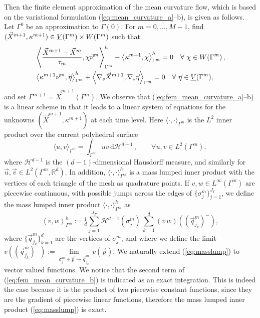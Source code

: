 Then the finite element approximation of the mean curvature flow, which is
based on the variational formulation (\ref{eq:mean_curvature_a}--b), is given
as follows. Let $\Gamma^0$ be an approximation to $\Gamma(0)$. For $m=0,\ldots,
M-1$, find $(\vec{X}^{m+1}, \kappa^{m+1}) \in \underline{V}(\Gamma^m) \times W(\Gamma^m)$
such that
\begin{subequations}
\begin{align}
&\left\langle \frac{\vec{X}^{m + 1} - \vec{X}^{m}}{\tau_m},
\chi\vec{\nu}^m\right\rangle_{\Gamma^m}^h - \left\langle\kappa^{m+1}, \chi
\right\rangle_{\Gamma^m}^h=0\quad \forall\ \chi \in
W(\Gamma^m)\,,\label{eq:fem_mean_curvature_a}\\
&\left\langle\kappa^{m+1}\vec{\nu}^m, \vec{\eta}\right\rangle_{\Gamma^m}^{h} +
\left\langle\nabla_s\vec{X}^{m + 1},
\nabla_s\vec{\eta}\right\rangle_{\Gamma^m}=0\quad \forall\ \vec\eta \in \underline{V}(\Gamma^m),
\label{eq:fem_mean_curvature_b}
\end{align}
\end{subequations}
and set $\Gamma^{m+1} = \vec{X}^{m+1}(\Gamma^m)$. We observe that
(\ref{eq:fem_mean_curvature_a}--b) is a linear scheme in that it leads to a
linear system of equations for the unknowns $(\vec{X}^{m+1}, \kappa^{m+1})$ at
each time level. Here $\langle\cdot,\cdot\rangle_{\Gamma^m}$ is the $L^2$ inner
product over the current polyhedral surface
\begin{equation}\label{}
\langle u,v\rangle_{\Gamma^m} =
\int_{\Gamma^m}uv\,\mathrm{d}\mathcal{H}^{d-1}\,, \qquad\forall u,v \in
L^2(\Gamma^m),
\end{equation}
where $\mathcal{H}^{d-1}$ is the $(d-1)$-dimensional Hausdorff measure, and
similarly for $\vec{u},\vec{v}\in L^2(\Gamma^m,\mathbb{R}^d)$. In addition,
$\langle \cdot,\cdot\rangle_{\Gamma^m}^h$ is a mass lumped inner product with
the vertices of each triangle of the mesh as quadrature points. If $v,w \in
L^\infty(\Gamma^m)$ are piecewise continuous, with possible jumps
across the edges of $\{\sigma_j^m\}_{j=1}^{J_\Gamma}$, we define the mass
lumped inner product $\langle\cdot,\cdot\rangle_{\Gamma^m}^h$ as
\begin{equation} \label{eq:masslump}
\left\langle v, w \right\rangle^h_{\Gamma^m} :=
\tfrac1d \sum_{j=1}^{J_\Gamma} \mathcal{H}^{d-1}(\sigma^m_j)\,
\sum_{k=1}^{d} (v\,w)((\vec{q}^m_{j_k})^-),
\end{equation}
where $\{\vec{q}^m_{j_k}\}_{k=1}^{d}$ are the vertices of $\sigma^m_j$, and
where we define the limit $v((\vec{q}^m_{j_k})^-)
:= \underset{\sigma^m_j\ni \vec{p}\to \vec{q}^m_{j_k}}{\lim}\, v(\vec{p})$. We
naturally extend (\ref{eq:masslump}) to vector valued functions. We notice that
the second term of (\ref{eq:fem_mean_curvature_b}) is indicated as an exact
integration. This is indeed the case because it is the product of two
piecewise constant functions, since they are the gradient of piecewise linear
functions, therefore the mass lumped inner product (\ref{eq:masslump}) is
exact.

